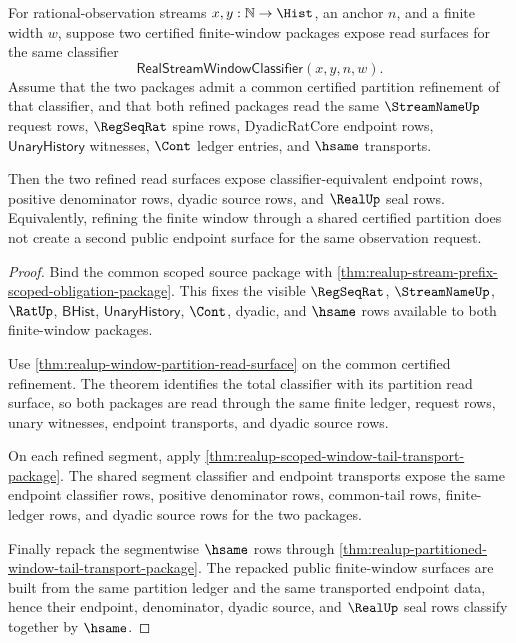 \begin{theorem}
\label{thm:realup-finite-window-common-refinement-determinacy}
For rational-observation streams $x,y:\mathbb{N}\to\Hist$, an anchor $n$, and
a finite width $w$, suppose two certified finite-window packages expose
read surfaces for the same classifier
$$
\mathsf{RealStreamWindowClassifier}(x,y,n,w).
$$
Assume that the two packages admit a common certified partition refinement of
that classifier, and that both refined packages read the same $\StreamNameUp$
request rows, $\RegSeqRat$ spine rows, DyadicRatCore endpoint rows,
$\mathsf{UnaryHistory}$ witnesses, $\Cont$ ledger entries, and $\hsame$
transports.

Then the two refined read surfaces expose classifier-equivalent endpoint rows,
positive denominator rows, dyadic source rows, and $\RealUp$ seal rows.
Equivalently, refining the finite window through a shared certified partition
does not create a second public endpoint surface for the same observation
request.
\end{theorem}
\begin{proof}
Bind the common scoped source package with
\autoref{thm:realup-stream-prefix-scoped-obligation-package}. This fixes the
visible $\RegSeqRat$, $\StreamNameUp$, $\RatUp$, $\mathsf{BHist}$,
$\mathsf{UnaryHistory}$, $\Cont$, dyadic, and $\hsame$ rows available to both
finite-window packages.

Use \autoref{thm:realup-window-partition-read-surface} on the common
certified refinement. The theorem identifies the total classifier with its
partition read surface, so both packages are read through the same finite
ledger, request rows, unary witnesses, endpoint transports, and dyadic source
rows.

On each refined segment, apply
\autoref{thm:realup-scoped-window-tail-transport-package}. The shared segment
classifier and endpoint transports expose the same endpoint classifier rows,
positive denominator rows, common-tail rows, finite-ledger rows, and dyadic
source rows for the two packages.

Finally repack the segmentwise $\hsame$ rows through
\autoref{thm:realup-partitioned-window-tail-transport-package}. The repacked
public finite-window surfaces are built from the same partition ledger and the
same transported endpoint data, hence their endpoint, denominator, dyadic
source, and $\RealUp$ seal rows classify together by $\hsame$.
\end{proof}


